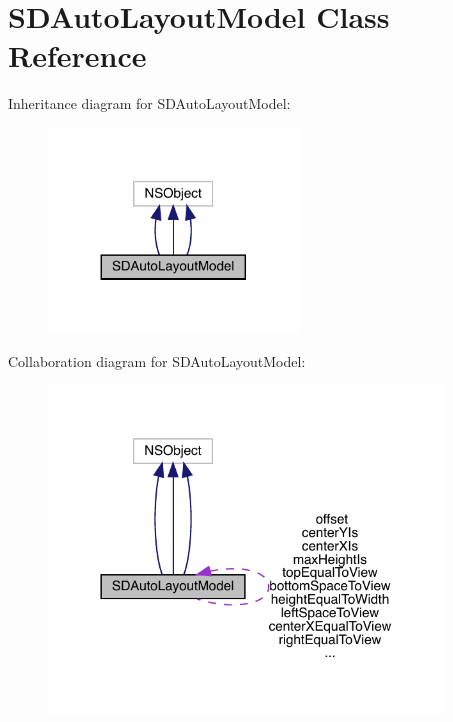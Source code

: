 \hypertarget{interface_s_d_auto_layout_model}{}\section{S\+D\+Auto\+Layout\+Model Class Reference}
\label{interface_s_d_auto_layout_model}


Inheritance diagram for S\+D\+Auto\+Layout\+Model\+:\nopagebreak
\begin{figure}[H]
\begin{center}
\leavevmode
\includegraphics[width=188pt]{interface_s_d_auto_layout_model__inherit__graph}
\end{center}
\end{figure}


Collaboration diagram for S\+D\+Auto\+Layout\+Model\+:\nopagebreak
\begin{figure}[H]
\begin{center}
\leavevmode
\includegraphics[width=298pt]{interface_s_d_auto_layout_model__coll__graph}
\end{center}
\end{figure}
